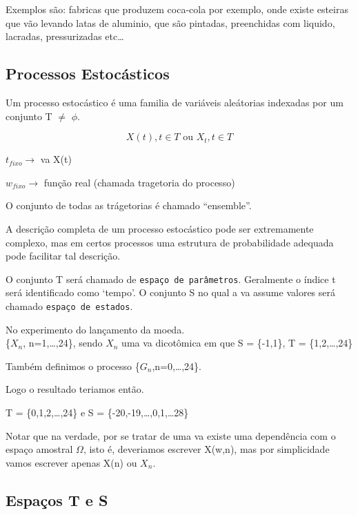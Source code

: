 \documentclass[]{article}
\theoremstyle{definition}
\theoremstyle{definition}
\theoremstyle{definition}
\theoremstyle{remark}
\let\BeginKnitrBlock\begin \let\EndKnitrBlock\end
\begin{document}
Exemplos são: fabricas que produzem coca-cola por exemplo, onde existe
esteiras que vão levando latas de aluminio, que são pintadas,
preenchidas com liquido, lacradas, pressurizadas etc\ldots{}

\subsection{Processos Estocásticos}\label{processos-estocasticos}

\BeginKnitrBlock{definition}
\protect\hypertarget{def:unnamed-chunk-10}{}{\label{def:unnamed-chunk-10}
}Um processo estocástico é uma familia de variáveis aleátorias indexadas
por um conjunto T \(\neq\) \(\phi\).
\EndKnitrBlock{definition}

\[{X(t), t \in T} \text{ ou } {X_t, t \in T}\]

\(t_{fixo} \rightarrow\) va X(t)

\(w_{fixo} \rightarrow\) função real (chamada tragetoria do processo)

O conjunto de todas as trágetorias é chamado ``ensemble''.

A descrição completa de um processo estocástico pode ser extremamente
complexo, mas em certos processos uma estrutura de probabilidade
adequada pode facilitar tal descrição.

O conjunto T será chamado de \texttt{espaço\ de\ parâmetros}. Geralmente
o índice t será identificado como `tempo'. O conjunto S no qual a va
assume valores será chamado \texttt{espaço\ de\ estados}.

\BeginKnitrBlock{example}
\protect\hypertarget{exm:unnamed-chunk-11}{}{\label{exm:unnamed-chunk-11}
}No experimento do lançamento da moeda.\\
\{\(X_n\), n=1,\ldots{},24\}, sendo \(X_n\) uma va dicotômica em que S =
\{-1,1\}, T = \{1,2,\ldots{},24\}

Também definimos o processo \{\(G_n\),n=0,\ldots{},24\}.

Logo o resultado teriamos então.

T = \{0,1,2,\ldots{},24\} e S = \{-20,-19,\ldots{},0,1,\ldots{}28\}

Notar que na verdade, por se tratar de uma va existe uma dependência com
o espaço amostral \(\Omega\), isto é, deveriamos escrever X(w,n), mas
por simplicidade vamos escrever apenas X(n) ou \(X_n\).
\EndKnitrBlock{example}

\subsection{Espaços T e S}\label{espacos-t-e-s}
\end{document}
